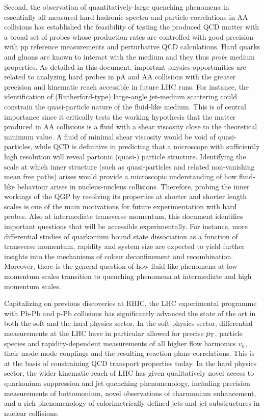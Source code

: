 \documentclass[../report.tex]{subfiles}
\begin{document}
Second, the observation of quantitatively-large quenching phenomena in essentially all measured hard hadronic spectra and particle correlations in AA collisions has established the feasibility of testing the produced QCD matter with a broad set of probes whose production rates are controlled with good precision with pp reference measurements and perturbative QCD calculations. Hard quarks and gluons are known to interact with the medium and they thus {\it probe} medium properties. As detailed in this document, important physics opportunities are related to analyzing hard probes in pA and AA collisions with the greater precision and kinematic reach accessible in future LHC runs. For instance, the identification of (Rutherford-type) large-angle jet-medium scattering could constrain the quasi-particle nature of the fluid-like medium. This is of central importance since it critically tests the working hypothesis that the matter produced in AA collisions is a fluid with a shear viscosity close to the theoretical minimum value. A fluid of minimal shear viscosity would be void of quasi-particles, while QCD is definitive in predicting that a microscope with sufficiently high resolution will reveal partonic (quasi-) particle structure. Identifying the scale at which inner structure (such as quasi-particles and related non-vanishing mean free paths) arises would provide a microscopic understanding of how fluid-like behaviour arises in nucleus-nucleus collisions. Therefore, probing the inner workings of the QGP by resolving its properties at shorter and shorter length scales is one of the main motivations for future experimentation with hard probes. Also at intermediate transverse momentum, this document identifies important questions that will be accessible experimentally. For instance, more differential studies of quarkonium bound state dissociation as a function of transverse momentum, rapidity and system size are expected to yield further insights into the mechanisms of colour deconfinement and recombination. Moreover, there is the general question of how fluid-like phenomena at low momentum scales transition to quenching phenomena at intermediate and high momentum scales.

Capitalizing on previous discoveries at RHIC, the LHC experimental programme with Pb-Pb and p-Pb collisions has significantly advanced the state of the art in both the soft and the hard physics sector. In the soft physics sector, differential measurements at the LHC have in particular allowed for precise $p\sb{\scriptstyle\mathrm{T}}$, particle species and rapidity-dependent measurements of all higher flow harmonics $v_n$, their mode-mode couplings and the resulting reaction plane correlations. This is at the basis of constraining QCD transport properties today. In the hard physics sector, the wider kinematic reach of LHC has given qualitatively novel access to quarkonium suppression and jet quenching phenomenology, including precision measurements of bottomonium, novel observations of charmonium enhancement, and a rich phenomenology of calorimetrically defined jets and jet substructures in nuclear collisions.
\end{document}
